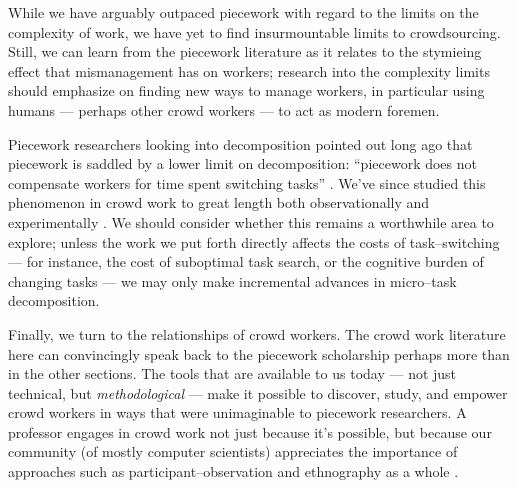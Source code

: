 \documentclass[trackingWork]{subfiles}
\begin{document}
While we have arguably outpaced piecework with regard to the limits on the complexity of work,
we have yet to find insurmountable limits to crowdsourcing.
Still, we can learn from the piecework literature as it relates to
the stymieing effect that mismanagement has on workers;
research into the complexity limits should emphasize on finding new ways to manage workers,
in particular using humans --- perhaps other crowd workers ---
to act as modern foremen.

Piecework researchers looking into decomposition pointed out long ago that
piecework is saddled by a lower limit on decomposition:
``piecework does not compensate workers for time spent switching tasks''
\cite{bewley1999wages}.
We've since studied this phenomenon in crowd work to great length both
observationally \cite{taskSearch} and
experimentally \cite{delayAndOrderLasecki}.
We should consider whether this remains a worthwhile area to explore; %
unless the work we put forth directly affects the costs of task--switching
--- for instance, the cost of suboptimal task search, or the cognitive burden of changing tasks ---
we may only make incremental advances in micro--task decomposition.

Finally, we turn to the relationships of crowd workers.
The crowd work literature here can convincingly speak back to
the piecework scholarship perhaps more than in the other sections.
The tools that are available to us today
--- not just technical, but \textit{methodological} ---
make it possible to
discover,
study, and
empower 
crowd workers in ways that were unimaginable to piecework researchers.
A professor engages in crowd work \cite{bighamHalfWorkday}
not just because it's possible, but because our community
(of mostly computer scientists)
appreciates the importance of approaches such as participant--observation and ethnography as a whole
\cite{olson2014ways}.




\onlyinsubfile{
  \balance{}
  \printbibliography
}
\end{document}
